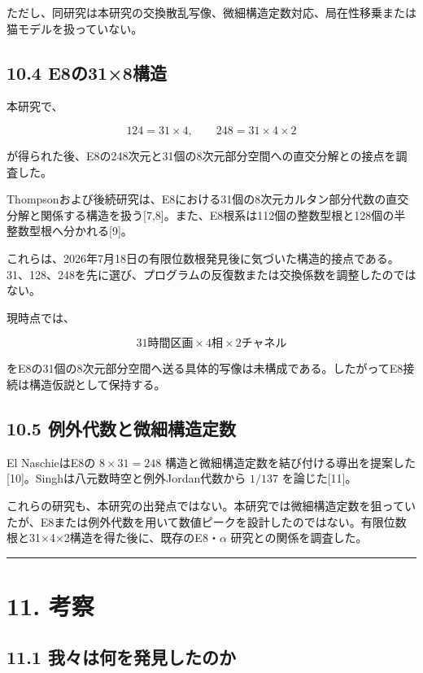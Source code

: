 \documentclass[
  10pt,
  a4paper,
]{article}
\begin{document}
ただし、同研究は本研究の交換散乱写像、微細構造定数対応、局在性移乗または猫モデルを扱っていない。

\subsection{10.4 E8の31×8構造}\label{e8ux306e318ux69cbux9020}

本研究で、

\[
124=31\times4,
\qquad
248=31\times4\times2
\]

が得られた後、E8の248次元と31個の8次元部分空間への直交分解との接点を調査した。

Thompsonおよび後続研究は、E8における31個の8次元カルタン部分代数の直交分解と関係する構造を扱う{[}7,8{]}。また、E8根系は112個の整数型根と128個の半整数型根へ分かれる{[}9{]}。

これらは、2026年7月18日の有限位数根発見後に気づいた構造的接点である。31、128、248を先に選び、プログラムの反復数または交換係数を調整したのではない。

現時点では、

\[
31\text{時間区画}\times
4\text{相}\times
2\text{チャネル}
\]

をE8の31個の8次元部分空間へ送る具体的写像は未構成である。したがってE8接続は構造仮説として保持する。

\subsection{10.5
例外代数と微細構造定数}\label{ux4f8bux5916ux4ee3ux6570ux3068ux5faeux7d30ux69cbux9020ux5b9aux6570}

El NaschieはE8の \(8\times31=248\)
構造と微細構造定数を結び付ける導出を提案した{[}10{]}。Singhは八元数時空と例外Jordan代数から
\(1/137\) を論じた{[}11{]}。

これらの研究も、本研究の出発点ではない。本研究では微細構造定数を狙っていたが、E8または例外代数を用いて数値ピークを設計したのではない。有限位数根と31×4×2構造を得た後に、既存のE8・\(\alpha\)
研究との関係を調査した。

\begin{center}\rule{0.5\linewidth}{0.5pt}\end{center}

\section{11. 考察}\label{ux8003ux5bdf}

\subsection{11.1
我々は何を発見したのか}\label{ux6211ux3005ux306fux4f55ux3092ux767aux898bux3057ux305fux306eux304b}
\end{document}
